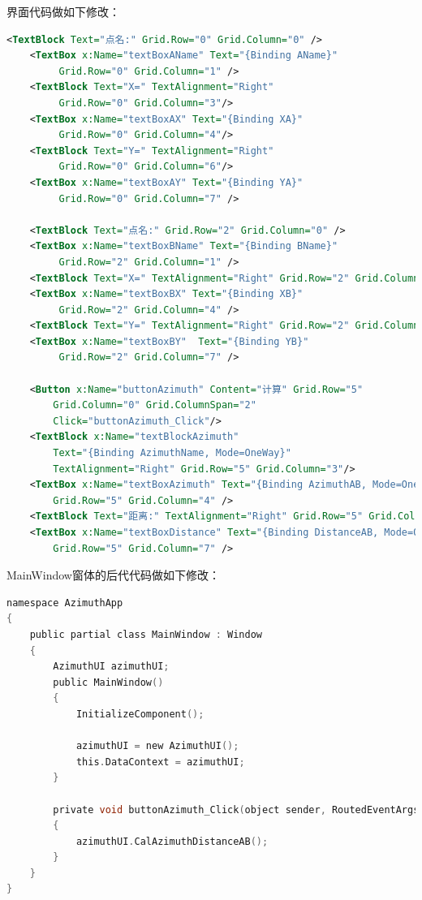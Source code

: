 界面代码做如下修改：
\begin{lstlisting}[language=XML]
<TextBlock Text="点名:" Grid.Row="0" Grid.Column="0" />
    <TextBox x:Name="textBoxAName" Text="{Binding AName}" 
         Grid.Row="0" Grid.Column="1" />
    <TextBlock Text="X=" TextAlignment="Right"
         Grid.Row="0" Grid.Column="3"/>
    <TextBox x:Name="textBoxAX" Text="{Binding XA}" 
         Grid.Row="0" Grid.Column="4"/>
    <TextBlock Text="Y=" TextAlignment="Right" 
         Grid.Row="0" Grid.Column="6"/>
    <TextBox x:Name="textBoxAY" Text="{Binding YA}" 
         Grid.Row="0" Grid.Column="7" />

    <TextBlock Text="点名:" Grid.Row="2" Grid.Column="0" />
    <TextBox x:Name="textBoxBName" Text="{Binding BName}" 
         Grid.Row="2" Grid.Column="1" />
    <TextBlock Text="X=" TextAlignment="Right" Grid.Row="2" Grid.Column="3"/>
    <TextBox x:Name="textBoxBX" Text="{Binding XB}" 
         Grid.Row="2" Grid.Column="4" />
    <TextBlock Text="Y=" TextAlignment="Right" Grid.Row="2" Grid.Column="6"/>
    <TextBox x:Name="textBoxBY"  Text="{Binding YB}" 
         Grid.Row="2" Grid.Column="7" />

    <Button x:Name="buttonAzimuth" Content="计算" Grid.Row="5" 
        Grid.Column="0" Grid.ColumnSpan="2"
        Click="buttonAzimuth_Click"/>
    <TextBlock x:Name="textBlockAzimuth" 
        Text="{Binding AzimuthName, Mode=OneWay}" 
        TextAlignment="Right" Grid.Row="5" Grid.Column="3"/>
    <TextBox x:Name="textBoxAzimuth" Text="{Binding AzimuthAB, Mode=OneWay}" 
        Grid.Row="5" Grid.Column="4" />
    <TextBlock Text="距离:" TextAlignment="Right" Grid.Row="5" Grid.Column="6" />
    <TextBox x:Name="textBoxDistance" Text="{Binding DistanceAB, Mode=OneWay}"
        Grid.Row="5" Grid.Column="7" />
\end{lstlisting}

MainWindow窗体的后代代码做如下修改：

\begin{lstlisting}[language=C]
namespace AzimuthApp
{
    public partial class MainWindow : Window
    {
        AzimuthUI azimuthUI;
        public MainWindow()
        {
            InitializeComponent();

            azimuthUI = new AzimuthUI();
            this.DataContext = azimuthUI;
        }

        private void buttonAzimuth_Click(object sender, RoutedEventArgs e)
        {
            azimuthUI.CalAzimuthDistanceAB();
        }
    }
}
\end{lstlisting}


